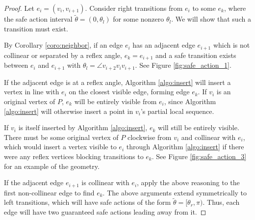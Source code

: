 \documentclass[]{article}
\begin{document}
\begin{proof}

Let $e_i = (v_i, v_{i+1})$. Consider right transitions from $e_i$ to some $e_k$,
where the safe action interval $\tilde{\theta} = (0, \theta_l)$ for some 
nonzero $\theta_l$. We will show that such a transition must exist. 

By Corollary \ref{coro:neighbor}, if an edge $e_i$ has an adjacent edge
$e_{i+1}$ which is not collinear or separated by a reflex angle, 
$e_k = e_{i+1}$ and a safe transition exists
between $e_i$ and $e_{i+1}$ with $\theta_l = \angle v_{i+2} v_i v_{i+1}$. 
See Figure \ref{fig:safe_action_1}.

If the adjacent edge is at a reflex angle, Algorithm 
\ref{algo:insert} will insert a vertex in line with $e_i$ on the closest visible
edge, forming edge $e_k$. If $v_i$ is an original
vertex of $P$, $e_k$ will be entirely visible from $e_i$, since Algorithm
\ref{algo:insert} will otherwise insert a point in $v_i$'s partial local
sequence.

If $v_i$ is itself inserted by Algorithm \ref{algo:insert}, $e_k$ will still be
entirely visible. There must be some original vertex of $P$
clockwise from $v_i$ and collinear with $e_i$, which would insert a vertex
visible to $e_i$ through Algorithm \ref{algo:insert} if there were any reflex vertices
blocking transitions to $e_k$.
See Figure \ref{fig:safe_action_3} for an example of the geometry.

If the adjacent edge $e_{i+1}$ is collinear with $e_i$, apply the above reasoning 
to the first non-collinear edge to find $e_k$.
The above arguments extend symmetrically to left transitions, which will have
safe actions of the form $\tilde{\theta} = [\theta_r, \pi)$. Thus, each edge will 
have two guaranteed safe actions leading away from it.
\end{proof}
\end{document}

